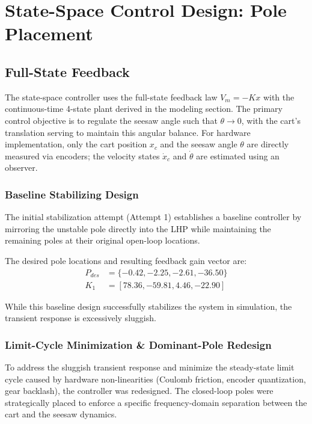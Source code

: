 \documentclass[11pt,a4paper]{article}
\begin{document}
\section{State-Space Control Design: Pole Placement}
\subsection{Full-State Feedback}
\label{sec:pole_placement}

The state-space controller uses the full-state feedback law $V_{m} = -Kx$ with the continuous-time 4-state plant derived in the modeling section. The primary control objective is to regulate the seesaw angle such that $\theta \rightarrow 0$, with the cart's translation serving to maintain this angular balance. For hardware implementation, only the cart position $x_{c}$ and the seesaw angle $\theta$ are directly measured via encoders; the velocity states $\dot{x}_{c}$ and $\dot{\theta}$ are estimated using an observer.

\subsubsection{Baseline Stabilizing Design}
The initial stabilization attempt (Attempt 1) establishes a baseline controller by mirroring the unstable pole directly into the LHP while maintaining the remaining poles at their original open-loop locations. 

The desired pole locations and resulting feedback gain vector are:
\begin{equation}
\begin{aligned}
    P_{des} &= \{-0.42, -2.25, -2.61, -36.50\} \\
    K_{1} &= [78.36, -59.81, 4.46, -22.90]
\end{aligned}
\end{equation}

While this baseline design successfully stabilizes the system in simulation, the transient response is excessively sluggish. 

\subsubsection{Limit-Cycle Minimization \& Dominant-Pole Redesign}
To address the sluggish transient response and minimize the steady-state limit cycle caused by hardware non-linearities (Coulomb friction, encoder quantization, gear backlash), the controller was redesigned. The closed-loop poles were strategically placed to enforce a specific frequency-domain separation between the cart and the seesaw dynamics.
\end{document}
